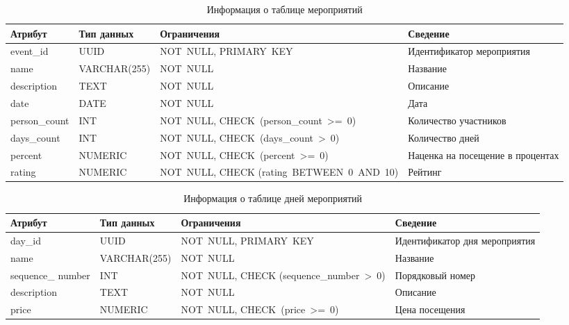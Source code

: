 \begin{table}[h]
	\centering
	\caption{Информация о таблице мероприятий}
	\begin{tabularx}{\textwidth}{|p{2.6cm}|X|p{6cm}|X|}
		\hline
		\textbf{Атрибут} & \textbf{Тип данных} & \textbf{Ограничения} & \textbf{Сведение} \\
		\hline
		event\_id & UUID & NOT~NULL, \newline PRIMARY~KEY & Идентификатор мероприятия \\
		\hline
		name & VARCHAR(255) & NOT~NULL & Название \\
		\hline
		description & TEXT & NOT~NULL & Описание \\
		\hline
		date & DATE & NOT~NULL & Дата \\
		\hline
		person\_count & INT & NOT~NULL, \newline CHECK~(person\_count~>=~0) & Количество участников \\
		\hline
		days\_count & INT & NOT~NULL, \newline CHECK~(days\_count~>~0) & Количество дней \\
		\hline
		percent & NUMERIC & NOT~NULL, \newline CHECK~(percent~>=~0) & Наценка на посещение в процентах \\
		\hline
		rating & NUMERIC & NOT~NULL, \newline CHECK (rating~BETWEEN~0~AND~10) & Рейтинг \\
		\hline
	\end{tabularx}
	\label{tbl:events}
\end{table}

\begin{table}[h]
	\centering
	\caption{Информация о таблице дней мероприятий}
	\begin{tabularx}{\textwidth}{|p{2.6cm}|X|p{6cm}|X|}
		\hline
		\textbf{Атрибут} & \textbf{Тип данных} & \textbf{Ограничения} & \textbf{Сведение} \\
		\hline
		day\_id & UUID & NOT~NULL, \newline PRIMARY~KEY & Идентификатор дня мероприятия \\
		\hline
		name & VARCHAR(255) & NOT~NULL & Название \\
		\hline
		sequence\_ number & INT & NOT~NULL, \newline CHECK (sequence\_number~>~0) & Порядковый номер \\
		\hline
		description & TEXT & NOT~NULL & Описание \\
		\hline
		price & NUMERIC & NOT~NULL, \newline CHECK~(price~>=~0) & Цена посещения \\
		\hline
	\end{tabularx}
	\label{tbl:days}
\end{table}

